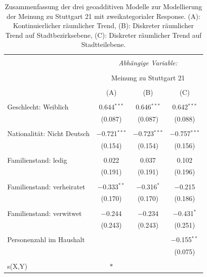 \documentclass{Vorlage}
\begin{document}
\begin{appendix}
\begin{table}[!htbp] \centering 
  \caption{Zusammenfassung der drei geoadditiven Modelle zur Modellierung der Meinung zu Stuttgart 21 mit zweikategorialer Response. (A): Kontinuierlicher räumlicher Trend, (B): Diskreter räumlicher Trend auf Stadtbezirksebene, (C): Diskreter räumlicher Trend auf Stadtteilebene.} 
  \label{ParameterTabS212spat} 
\begin{tabular}{@{\extracolsep{5pt}}lccc} 
\\[-1.8ex]\hline 
\hline \\[-1.8ex] 
 & \multicolumn{3}{c}{\textit{Abhängige Variable:}} \\ 
\cline{2-4} 
\\[-1.8ex] & \multicolumn{3}{c}{Meinung zu Stuttgart 21} \\ 
\\[-1.8ex] & (A) & (B) & (C)\\ 
\hline \\[-1.8ex] 
 Geschlecht: Weiblich & 0.644$^{***}$ & 0.646$^{***}$ & 0.642$^{***}$ \\ 
  & (0.087) & (0.087) & (0.088) \\ 
  & & & \\ 
 Nationalität: Nicht Deutsch & $-$0.721$^{***}$ & $-$0.723$^{***}$ & $-$0.757$^{***}$ \\ 
  & (0.154) & (0.154) & (0.156) \\ 
  & & & \\ 
 Familienstand: ledig & 0.022 & 0.037 & 0.102 \\ 
  & (0.191) & (0.191) & (0.196) \\ 
  & & & \\ 
 Familienstand: verheiratet & $-$0.333$^{**}$ & $-$0.316$^{*}$ & $-$0.215 \\ 
  & (0.170) & (0.170) & (0.186) \\ 
  & & & \\ 
 Familienstand: verwitwet & $-$0.244 & $-$0.234 & $-$0.431$^{*}$ \\ 
  & (0.243) & (0.243) & (0.251) \\ 
  & & & \\ 
   Personenzahl im Haushalt &  &  & $-$0.155$^{**}$ \\ 
  &  &  & (0.075) \\ 
    & & & \\ \hline
 s(X,Y) & $*$ &  &  \\ 

\end{tabular}
\end{table}
\end{appendix}
\end{document}
